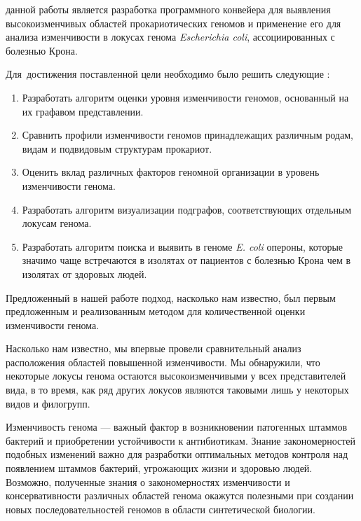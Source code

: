 {\aim} данной работы является разработка программного конвейера для выявления высокоизменчивых областей прокариотических геномов и применение его для анализа изменчивости в локусах генома \textit{Escherichia coli}, ассоциированных с болезнью Крона.


Для~достижения поставленной цели необходимо было решить следующие {\tasks}:
\begin{enumerate}[beginpenalty=10000] 
  \item Разработать алгоритм оценки уровня изменчивости геномов, основанный на их графавом представлении.
  \item Сравнить профили изменчивости геномов принадлежащих различным родам, видам и подвидовым структурам прокариот.
  \item Оценить вклад различных факторов геномной организации в уровень изменчивости генома. 
  \item Разработать алгоритм визуализации подграфов, соответствующих отдельным локусам генома.
  \item Разработать алгоритм поиска и выявить в геноме \textit{E. coli} опероны, которые значимо чаще встречаются в изолятах от пациентов с болезнью Крона чем в изолятах от здоровых людей.  
\end{enumerate}


{\novelty}
Предложенный в нашей работе подход, насколько нам известно, был первым предложенным и реализованным методом для количественной оценки изменчивости генома. 

Насколько нам известно, мы впервые провели сравнительный анализ расположения областей повышенной изменчивости. Мы обнаружили, что некоторые локусы генома остаются высокоизменчивыми у всех представителей вида, в то время, как ряд других локусов являются таковыми лишь у некоторых видов и филогрупп. 

{\influence} 

Изменчивость генома --- важный фактор в возникновении патогенных штаммов бактерий и приобретении устойчивости к антибиотикам. Знание закономерностей подобных изменений важно для разработки оптимальных методов контроля над появлением штаммов бактерий, угрожающих жизни и здоровью людей. Возможно, полученные знания о закономерностях изменчивости и консервативности различных областей генома окажутся полезными при создании новых последовательностей геномов в области синтетической биологии. 

